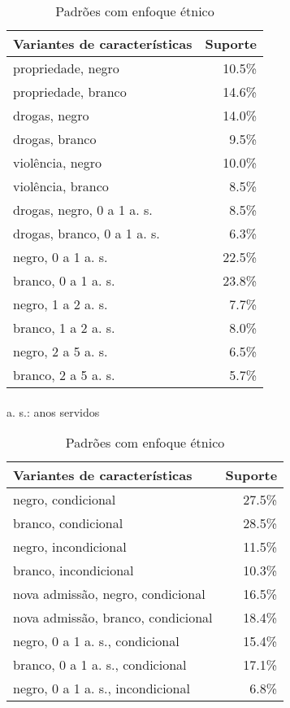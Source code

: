 \documentclass[12pt]{article}
\begin{document}
\begin{table}[h!]
\caption{Padrões com enfoque étnico}
\label{tab:racism}
\setlength\columnsep{-38pt}
\begin{multicols}{2}
\begin{tabular}{lr}
Variantes de características & Suporte\\
\hline
propriedade, negro & 10.5\%\\
propriedade, branco & 14.6\%\\
\arrayrulecolor{lightgray}\hline
drogas, negro & 14.0\%\\
drogas, branco & 9.5\%\\
\arrayrulecolor{lightgray}\hline
violência, negro & 10.0\%\\
violência, branco & 8.5\%\\
\arrayrulecolor{darkgray}\hline
drogas, negro, 0 a 1 a. s. & 8.5\%\\
drogas, branco, 0 a 1 a. s. & 6.3\%\\
\arrayrulecolor{lightgray}\hline
negro, 0 a 1 a. s. & 22.5\%\\
branco, 0 a 1 a. s. & 23.8\%\\
\arrayrulecolor{lightgray}\hline
negro, 1 a 2 a. s. & 7.7\%\\
branco, 1 a 2 a. s. & 8.0\%\\
\arrayrulecolor{lightgray}\hline
negro, 2 a 5 a. s. & 6.5\%\\
branco, 2 a 5 a. s. & 5.7\%
\end{tabular}
{\paragraph{} a. s.: anos servidos}
\vfill\null\columnbreak
\begin{tabular}{lr}
Variantes de características & Suporte\\
\hline
negro, condicional & 27.5\%\\
branco, condicional & 28.5\%\\
negro, incondicional & 11.5\%\\
branco, incondicional & 10.3\%\\
\arrayrulecolor{lightgray}\hline
nova admissão, negro, condicional & 16.5\%\\
nova admissão, branco, condicional & 18.4\%\\
\arrayrulecolor{lightgray}\hline
negro, 0 a 1 a. s., condicional & 15.4\%\\
branco, 0 a 1 a. s., condicional & 17.1\%\\
negro, 0 a 1 a. s., incondicional & 6.8\%\\

\end{tabular}
\end{multicols}
\end{table}
\end{document}
